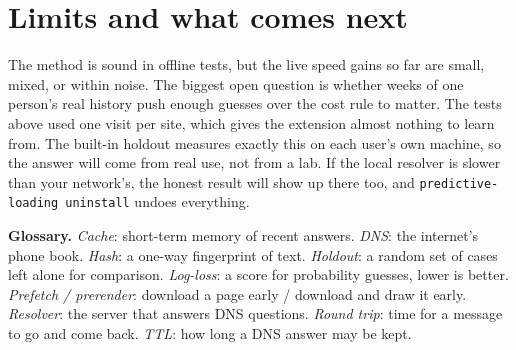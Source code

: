 \documentclass[11pt]{article}
\begin{document}
\section{Limits and what comes next}
The method is sound in offline tests, but the live speed gains so far are small, mixed, or within noise. The biggest open question is whether weeks of one person's real history push enough guesses over the cost rule to matter. The tests above used one visit per site, which gives the extension almost nothing to learn from. The built-in holdout measures exactly this on each user's own machine, so the answer will come from real use, not from a lab. If the local resolver is slower than your network's, the honest result will show up there too, and \texttt{predictive-loading uninstall} undoes everything.

\vspace{4pt}
\noindent\textbf{Glossary.} \textit{Cache}: short-term memory of recent answers. \textit{DNS}: the internet's phone book. \textit{Hash}: a one-way fingerprint of text. \textit{Holdout}: a random set of cases left alone for comparison. \textit{Log-loss}: a score for probability guesses, lower is better. \textit{Prefetch / prerender}: download a page early / download and draw it early. \textit{Resolver}: the server that answers DNS questions. \textit{Round trip}: time for a message to go and come back. \textit{TTL}: how long a DNS answer may be kept.
\end{document}
